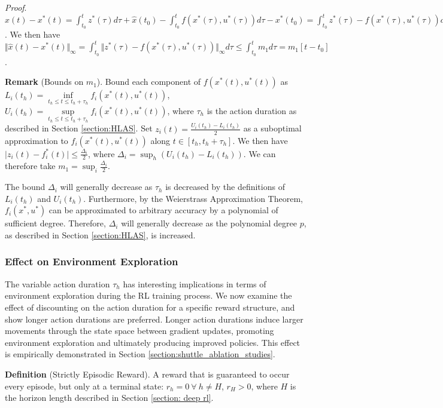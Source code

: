 \documentclass{UnderReview}
\begin{document}
\textit{Proof}.  $\hat x(t) - x^*(t) = \int_{t_0}^{t} z^*(\tau) d\tau + \hat x(t_0) - \int_{t_0}^{t} f(x^*(\tau),u^*(\tau)) d\tau - x^*(t_0) = \int_{t_0}^{t} z^*(\tau) - f(x^*(\tau),u^*(\tau)) d\tau $.  We then have $\Vert \hat x(t) - x^*(t) \Vert_\infty = \int_{t_0}^{t} \Vert z^*(\tau) - f(x^*(\tau),u^*(\tau)) \Vert_\infty d\tau \leq \int_{t_0}^{t} m_1 d\tau = m_1 [t-t_0]$.  

\textbf{Remark} (Bounds on $m_1$).  Bound each component of $f(x^*(t),u^*(t))$ as $L_i(t_h) = \inf\limits_{t_h \leq t \leq t_h+\tau_h} f_i(x^*(t),u^*(t))$, 
$U_i(t_h) =  \sup\limits_{t_h \leq t \leq t_h+\tau_h} f_i(x^*(t),u^*(t))$,
where $\tau_h$ is the action duration as described in Section \ref{section:HLAS}.  Set $z_i(t) = \frac{U_i(t_h)-L_i(t_h)}{2}$ as a suboptimal approximation to $f_i(x^*(t),u^*(t))$ along $t \in [t_h,t_h+\tau_h]$.  We then have $\vert z_i(t)-f_i^*(t) \vert  \leq \frac{\Delta_i}{2}$, where $\Delta_i=\sup_{h} (U_i(t_h) - L_i(t_h))$.  We can therefore take $m_1=\sup_i\frac{\Delta_i}{2}$.

The bound $\Delta_i$ will generally decrease as $\tau_h$ is decreased by the definitions of $L_i(t_h)$ and $U_i(t_h)$.  Furthermore, by the Weierstrass Approximation Theorem, $f_i(x^*, u^*)$ can be approximated to arbitrary accuracy by a polynomial of sufficient degree.  Therefore, $\Delta_i$ will generally decrease as the polynomial degree $p$, as described in Section \ref{section:HLAS}, is increased.  

\subsubsection{Effect on Environment Exploration}\label{section:episodic reward}
The variable action duration $\tau_h$ has interesting implications in terms of environment exploration during the RL training process.  We now examine the effect of discounting on the action duration for a specific reward structure, and show longer action durations are preferred. Longer action durations induce larger movements through the state space between gradient updates, promoting environment exploration and ultimately producing improved policies.  This effect is empirically demonstrated in Section \ref{section:shuttle_ablation_studies}.

\textbf{Definition} (Strictly Episodic Reward).  A reward that is guaranteed to occur every episode, but only at a terminal state: $r_h=0 ~\forall~ h \neq H$, $r_H > 0$, where $H$ is the horizon length described in Section \ref{section: deep rl}.
\end{document}
